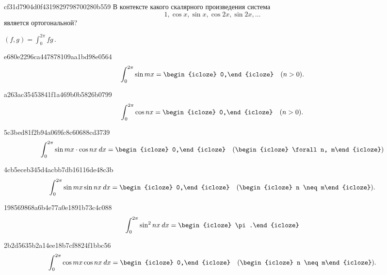 \begin{note}{cf31d7904d0f4319829798700280b559}
    В контексте какого скалярного произведения система
    \[
        1, \cos x, \sin x, \cos 2x, \sin 2x, \ldots
    \]
    является ортогональной?

    \begin{cloze}{1}
        \({ \displaystyle (f, g) = \int_{0}^{2\pi} f g }\)\,.
    \end{cloze}
\end{note}

\begin{note}{e680e2296ca447878109aa1bd98e0564}
    \[
        \int_{0}^{2\pi} \sin mx = \begin{icloze}{1}0,\end{icloze} \quad (n > 0).
    \]
\end{note}

\begin{note}{a263ac35453841f1a469b0b5826b0799}
    \[
        \int_{0}^{2\pi} \cos nx = \begin{icloze}{1}0,\end{icloze} \quad (n > 0).
    \]
\end{note}

\begin{note}{5c3bed81f2b94a069fc8c60688cd3739}
    \[
        \int_{0}^{2\pi} \sin mx \cdot \cos nx\: dx = \begin{icloze}{1}0,\end{icloze} \quad (\begin{icloze}{2}\forall n, m\end{icloze})
    \]
\end{note}

\begin{note}{4cb5eceb345d4acbb7db16116de48c3b}
    \[
        \int_{0}^{2\pi} \sin mx \sin nx\: dx = \begin{icloze}{1}0,\end{icloze} \quad (\begin{icloze}{2}n \neq m\end{icloze}).
    \]
\end{note}

\begin{note}{198569868a6b4e77a0e1891b73c4c088}
    \[
        \int_{0}^{2\pi} \sin^2 nx \: dx = \begin{icloze}{1}\pi.\end{icloze}
    \]
\end{note}

\begin{note}{2b2d5635b2a14ee18b7cf8824f1bbc56}
    \[
        \int_{0}^{2\pi} \cos mx \cos nx\: dx = \begin{icloze}{1}0,\end{icloze} \quad (\begin{icloze}{2}n \neq m\end{icloze}).
    \]
\end{note}

